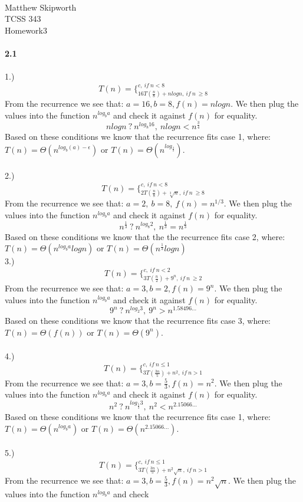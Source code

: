 \documentclass[page=4,11pt]{article}
\begin{document}
\ \\
Matthew Skipworth\\
TCSS 343\\
Homework3\\ \\
\textbf{2.1}\\ \\
1.) $$T(n)= \Bigg\{^{c,\ if\ n<8}_{16T(\frac{n}{8})+nlogn,\ if\ n\ \geq 8}$$
From the recurrence we see that: $a=16, b=8, f(n)=nlogn$.
We then plug the values into the function $n^{log_{b}a}$ and check
it against $f(n)$ for equality.
$$nlogn\ ?\ n^{log_{8}16},\ nlogn<n^{\frac{3}{4}}$$
Based on these conditions we know that the recurrence fits case 1, 
where: $T(n)= \Theta(n^{log_{b}(a)-\epsilon})$ or $T(n)=  \Theta(n^{log_{\frac{4}{3}}})$.\\ \\
2.) $$T(n)= \Bigg\{^{c,\ if\ n<8}_{2T(\frac{n}{8})+\sqrt[3]{n},\ if\ n\ \geq 8}$$
From the recurrence we see that: $a=2,\ b=8,\ f(n)=n^{1/3}$.
We then plug the values into the function $n^{log_{b}a}$ and check
it against $f(n)$ for equality.
$$n^{ \frac{1}{3}}\ ?\ n^{log_{8}2},\ n^{ \frac{1}{3}}=n^{ \frac{1}{3}}$$
Based on these conditions we know that the the recurrence fits case 2, where: $T(n)= \Theta(n^{log_{b}a}logn)$ or $T(n)=\Theta(n^{\frac{1}{3}}logn)$\\
3.) $$T(n)= \Bigg\{^{c,\ if\ n<2}_{3T(\frac{n}{2})+9^{n},\ if\ n\ \geq 2}$$
From the recurrence we see that: $a=3, b=2, f(n)=9^n$.
We then plug the values into the function $n^{log_{b}a}$ and check
it against $f(n)$ for equality.
$$9^n\ ?\ n^{log_{2}3},\ 9^n>n^{1.58496 \dots}$$
Based on these conditions we know that the recurrence fits case 3, 
where: $T(n)= \Theta(f(n))$ or $T(n)=  \Theta(9^n)$.\\ \\
4.) $$T(n)= \Bigg\{^{c,\ if\ n\leq1}_{3T(\frac{3n}{5})+n^{2},\ if\ n > 1}$$
From the recurrence we see that: $a=3, b=\frac{5}{3}, f(n)=n^{2}$.
We then plug the values into the function $n^{log_{b}a}$ and check
it against $f(n)$ for equality.
$$n^{2}\ ?\ n^{log_{\frac{5}{3}}3},\ n^2<n^{2.15066 \dots}$$
Based on these conditions we know that the recurrence fits case 1, 
where: $T(n)= \Theta(n^{log_ba})$ or $T(n)=  \Theta(n^{2.15066 \dots})$.\\ \\
5.) $$T(n)= \Bigg\{^{c,\ if\ n\leq1}_{3T(\frac{3n}{5})+n^{2}\sqrt{n},\ if\ n > 1}$$
From the recurrence we see that: $a=3, b=\frac{5}{3}, f(n)=n^{2}\sqrt{n}$.
We then plug the values into the function $n^{log_{b}a}$ and check
\end{document}
